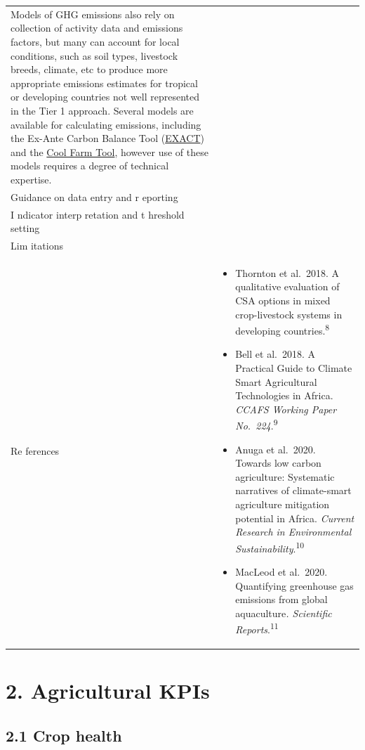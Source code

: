 \documentclass[
  letterpaper,
  DIV=11,
  numbers=noendperiod]{scrreprt}
\begin{document}
\begin{longtable}[]{@{}
  >{\raggedright\arraybackslash}p{}
  >{\raggedright\arraybackslash}p{}@{}}
\begin{minipage}[t]{\linewidth}
Models of GHG emissions also rely on collection of activity data and
emissions factors, but many can account for local conditions, such as
soil types, livestock breeds, climate, etc to produce more appropriate
emissions estimates for tropical or developing countries not well
represented in the Tier 1 approach. Several models are available for
calculating emissions, including the Ex-Ante Carbon Balance Tool
(\href{https://www.fao.o\%20rg/in-action/epic/ex-act-tool/suite-of-tools/ex-act/en/}{EXACT})
and the \href{https://coolfarmtool.org/}{Cool Farm Tool}, however use of
these models requires a degree of technical expertise.
\end{minipage} \\
Guidance on data entry and r eporting & \\
I ndicator interp retation and t hreshold setting & \\
Lim itations & \\
Re ferences & \begin{minipage}[t]{\linewidth}\raggedright
\begin{itemize}
\item
  Thornton et al.~2018. A qualitative evaluation of CSA options in mixed
  crop-livestock systems in developing countries.\textsuperscript{8}
\item
  Bell et al.~2018. A Practical Guide to Climate Smart Agricultural
  Technologies in Africa. \emph{CCAFS Working Paper
  No.~224}.\textsuperscript{9}
\item
  Anuga et al.~2020. Towards low carbon agriculture: Systematic
  narratives of climate-smart agriculture mitigation potential in
  Africa. \emph{Current Research in Environmental
  Sustainability}.\textsuperscript{10}
\item
  MacLeod et al.~2020. Quantifying greenhouse gas emissions from global
  aquaculture\emph{. Scientific Reports}.\textsuperscript{11}
\end{itemize}
\end{minipage} \\
\end{longtable}

\part{2. Agricultural KPIs}

\chapter{2.1 Crop health}\label{crop-health}
\end{document}
